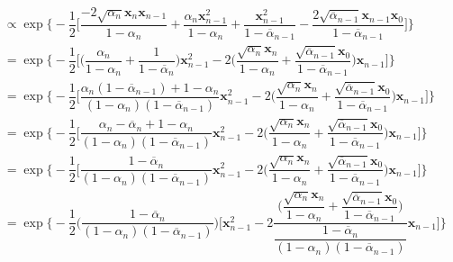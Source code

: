 \documentclass[14pt, a4paper]{article}
\numberwithin{equation}{section}
\numberwithin{figure}{section}
\numberwithin{dl}{section}
\numberwithin{md}{section}
\numberwithin{bd}{section}
\numberwithin{dn}{section}
\numberwithin{hq}{section}
\begin{document}
\begin{equation*}
\begin{aligned}
            & \propto \exp \Bigg \lbrace - \dfrac{1}{2} \Bigg \lbrack \dfrac{-2 \sqrt{\alpha_n} \boldsymbol{x}_n \boldsymbol{x}_{n-1}}{1 - \alpha_n} + \dfrac{\alpha_n \boldsymbol{x}_{n-1}^2}{1 - \alpha_n} + \dfrac{\boldsymbol{x}_{n-1}^2}{1 - \overline{\alpha}_{n-1}} - \dfrac{2 \sqrt{\overline{\alpha}_{n-1}} \boldsymbol{x}_{n-1} \boldsymbol{x}_0}{1 - \overline{\alpha}_{n-1}}  \Bigg \rbrack \Bigg \rbrace \\
            &= \exp \Bigg \lbrace - \dfrac{1}{2} \Bigg \lbrack \Big ( \dfrac{\alpha_n}{1 - \alpha_n} + \dfrac{1}{1 - \overline{\alpha}_n} \Big )\boldsymbol{x}_{n-1}^2 - 2 \Big( \dfrac{\sqrt{\alpha_n}\boldsymbol{x}_n}{1 - \alpha_n} + \dfrac{\sqrt{\overline{\alpha}_{n-1}} \boldsymbol{x}_0}{1 - \overline{\alpha}_{n-1}} \Big) \boldsymbol{x}_{n-1} \Bigg \rbrack \Bigg \rbrace \\
            &= \exp \Bigg \lbrace - \dfrac{1}{2} \Bigg \lbrack \dfrac{\alpha_n (1 - \overline{\alpha}_{n-1}) + 1 - \alpha_n}{(1 - \alpha_n)(1 - \overline{\alpha}_{n-1})} \boldsymbol{x}_{n-1}^2 - 2 \Big( \dfrac{\sqrt{\alpha_n}\boldsymbol{x}_n}{1 - \alpha_n} + \dfrac{\sqrt{\overline{\alpha}_{n-1}} \boldsymbol{x}_0}{1 - \overline{\alpha}_{n-1}} \Big) \boldsymbol{x}_{n-1}  \Bigg \rbrack \Bigg \rbrace \\
            &= \exp \Bigg \lbrace - \dfrac{1}{2} \Bigg \lbrack \dfrac{\alpha_n - \overline{\alpha}_n + 1 - \alpha_n}{(1 - \alpha_n)(1 - \overline{\alpha}_{n-1})} \boldsymbol{x}_{n-1}^2 - 2 \Big( \dfrac{\sqrt{\alpha_n}\boldsymbol{x}_n}{1 - \alpha_n} + \dfrac{\sqrt{\overline{\alpha}_{n-1}} \boldsymbol{x}_0}{1 - \overline{\alpha}_{n-1}} \Big) \boldsymbol{x}_{n-1}  \Bigg \rbrack \Bigg \rbrace \\
            &= \exp \Bigg \lbrace - \dfrac{1}{2} \Bigg \lbrack \dfrac{1 - \overline{\alpha}_n}{(1 - \alpha_n)(1 - \overline{\alpha}_{n-1})} \boldsymbol{x}_{n-1}^2 - 2 \Big( \dfrac{\sqrt{\alpha_n}\boldsymbol{x}_n}{1 - \alpha_n} + \dfrac{\sqrt{\overline{\alpha}_{n-1}} \boldsymbol{x}_0}{1 - \overline{\alpha}_{n-1}} \Big) \boldsymbol{x}_{n-1}  \Bigg \rbrack \Bigg \rbrace \\
            &= \exp \Biggl \lbrace - \dfrac{1}{2} \Big( \dfrac{1 - \overline{\alpha}_n}{(1 - \alpha_n)(1 - \overline{\alpha}_{n-1})} \Big) \Bigg \lbrack \boldsymbol{x}_{n-1}^2 - 2 \dfrac{\Big( \dfrac{\sqrt{\alpha_n}\boldsymbol{x}_n}{1 - \alpha_n} + \dfrac{\sqrt{\overline{\alpha}_{n-1}} \boldsymbol{x}_0}{1 - \overline{\alpha}_{n-1}} \Big)}{\dfrac{1 - \overline{\alpha}_n}{(1 - \alpha_n)(1 - \overline{\alpha}_{n-1})}} \boldsymbol{x}_{n-1} \Bigg \rbrack \Biggl \rbrace \\

\end{aligned}
\end{equation*}
\end{document}
